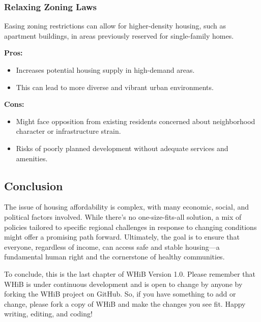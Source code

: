\subsubsection*{Relaxing Zoning Laws}
Easing zoning restrictions can allow for higher-density housing, such as apartment buildings, in areas previously reserved for single-family homes.

\textbf{Pros:}
\begin{itemize}
    \item Increases potential housing supply in high-demand areas.
    \item This can lead to more diverse and vibrant urban environments.
\end{itemize}

\textbf{Cons:}
\begin{itemize}
    \item Might face opposition from existing residents concerned about neighborhood character or infrastructure strain.
    \item Risks of poorly planned development without adequate services and amenities.
\end{itemize}

\subsection*{Conclusion}
The issue of housing affordability is complex, with many economic, social, and political factors involved. While there's no one-size-fits-all solution, a mix of policies tailored to specific regional challenges in response to changing conditions might offer a promising path forward. Ultimately, the goal is to ensure that everyone, regardless of income, can access safe and stable housing—a fundamental human right and the cornerstone of healthy communities.

To conclude, this is the last chapter of WHiB Version 1.0. Please remember that WHiB is under continuous development and is open to change by anyone by forking the WHiB project on GitHub. So, if you have something to add or change, please fork a copy of WHiB and make the changes you see fit. Happy writing, editing, and coding!
